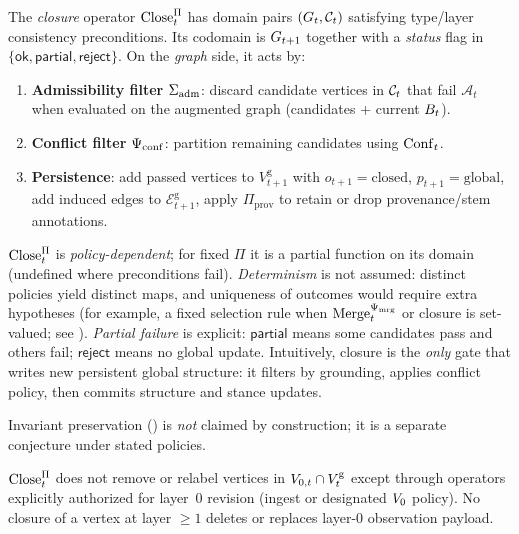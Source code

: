 \begin{definition}
\label{def:closure-op}
The \emph{closure} operator $\mathrm{Close}_t^{\Pi}$ has domain pairs $(G_t,\mathcal{C}_t)$ satisfying type/layer consistency preconditions.
Its codomain is $G_{t+1}$ together with a \emph{status} flag in $\{\mathsf{ok},\mathsf{partial},\mathsf{reject}\}$.
On the \emph{graph} side, it acts by:
\begin{enumerate}[label=\arabic*.,leftmargin=*]
  \item \textbf{Admissibility filter} $\Sigma_{\mathrm{adm}}$: discard candidate vertices in $\mathcal{C}_t$ that fail $\mathcal{A}_t$ when evaluated on the augmented graph (candidates + current $B_t$).
  \item \textbf{Conflict filter} $\Psi_{\mathrm{conf}}$: partition remaining candidates using $\mathrm{Conf}_t$.
  \item \textbf{Persistence}: add passed vertices to $V^{\mathrm{g}}_{t+1}$ with $o_{t+1}=\text{closed}$, $p_{t+1}=\text{global}$, add induced edges to $\mathcal{E}^{\mathrm{g}}_{t+1}$, apply $\Pi_{\mathrm{prov}}$ to retain or drop provenance/stem annotations.
\end{enumerate}
$\mathrm{Close}_t^{\Pi}$ is \emph{policy-dependent}; for fixed $\Pi$ it is a partial function on its domain (undefined where preconditions fail).
\emph{Determinism} is not assumed: distinct policies yield distinct maps, and uniqueness of outcomes would require extra hypotheses (for example, a fixed selection rule when $\mathrm{Merge}_t^{\Psi_{\mathrm{mrg}}}$ or closure is set-valued; see ).
\emph{Partial failure} is explicit: $\mathsf{partial}$ means some candidates pass and others fail; $\mathsf{reject}$ means no global update.
Intuitively, closure is the \emph{only} gate that writes new persistent global structure: it filters by grounding, applies conflict policy, then commits structure and stance updates.
\end{definition}

Invariant preservation () is \emph{not} claimed by construction; it is a separate conjecture under stated policies.

\begin{axiom}
\label{ax:layer-zero}
$\mathrm{Close}_t^{\Pi}$ does not remove or relabel vertices in $V_{0,t}\cap V^{\mathrm{g}}_t$ except through operators explicitly authorized for layer~0 revision (ingest or designated $V_{0}$ policy).
No closure of a vertex at layer $\ge 1$ deletes or replaces layer-$0$ observation payload.
\end{axiom}

